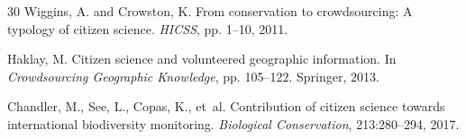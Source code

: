 \documentclass[11pt,a4paper]{article}
\begin{document}
\begin{thebibliography}{30}
Wiggins, A. and Crowston, K.
\newblock From conservation to crowdsourcing: A typology of citizen science.
\newblock \emph{HICSS}, pp. 1--10, 2011.

Haklay, M.
\newblock Citizen science and volunteered geographic information.
\newblock In \emph{Crowdsourcing Geographic Knowledge}, pp. 105--122.
  Springer, 2013.

Chandler, M., See, L., Copas, K., et~al.
\newblock Contribution of citizen science towards international biodiversity
  monitoring.
\newblock \emph{Biological Conservation}, 213:280--294, 2017.

\end{thebibliography}
\end{document}
